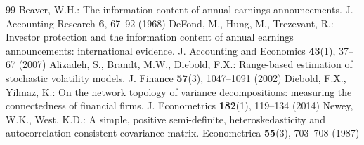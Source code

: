 \documentclass[runningheads,a4paper]{llncs}
\begin{document}
\begin{thebibliography}{99}
 Beaver, W.H.: The information content of annual earnings announcements. J. Accounting Research \textbf{6}, 67--92 (1968)
 DeFond, M., Hung, M., Trezevant, R.: Investor protection and the information content of annual earnings announcements: international evidence. J. Accounting and Economics \textbf{43}(1), 37--67 (2007)
 Alizadeh, S., Brandt, M.W., Diebold, F.X.: Range-based estimation of stochastic volatility models. J. Finance \textbf{57}(3), 1047--1091 (2002)
 Diebold, F.X., Yilmaz, K.: On the network topology of variance decompositions: measuring the connectedness of financial firms. J. Econometrics \textbf{182}(1), 119--134 (2014)
 Newey, W.K., West, K.D.: A simple, positive semi-definite, heteroskedasticity and autocorrelation consistent covariance matrix. Econometrica \textbf{55}(3), 703--708 (1987)
\end{thebibliography}
\end{document}
